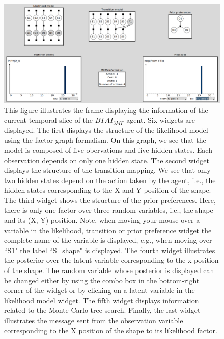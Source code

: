 \documentclass[twoside,11pt]{article}
\begin{document}
\begin{figure}[H]
	\begin{center}
	\includegraphics[scale=0.3]{ts_frame_for_current_ts}
	\end{center}
  \caption{This figure illustrates the frame displaying the information of the current temporal slice of the $BTAI_{3MF}$ agent. Six widgets are displayed. The first displays the structure of the likelihood model using the factor graph formalism. On this graph, we see that the model is composed of five obervations and five hidden states. Each observation depends on only one hidden state. The second widget displays the structure of the transition mapping. We see that only two hidden states depend on the action taken by the agent, i.e., the hidden states corresponding to the X and Y position of the shape. The third widget shows the structure of the prior preferences. Here, there is only one factor over three random variables, i.e., the shape and its (X, Y) position. Note, when moving your mouse over a variable in the likelihood, transition or prior preference widget the complete name of the variable is displayed, e.g., when moving over ``S1" the label ``S\_shape" is displayed. The fourth widget illustrates the posterior over the latent variable corresponding to the x position of the shape. The random variable whose posterior is displayed can be changed either by using the combo box in the bottom-right corner of the widget or by clicking on a latent variable in the likelihood model widget. The fifth widget displays information related to the Monte-Carlo tree search. Finally, the last widget illustrates the message sent from the observation variable corresponding to the X position of the shape to its likelihood factor.}
   \label{fig:gui_tsf_for_current_ts}
\end{figure}
\end{document}
